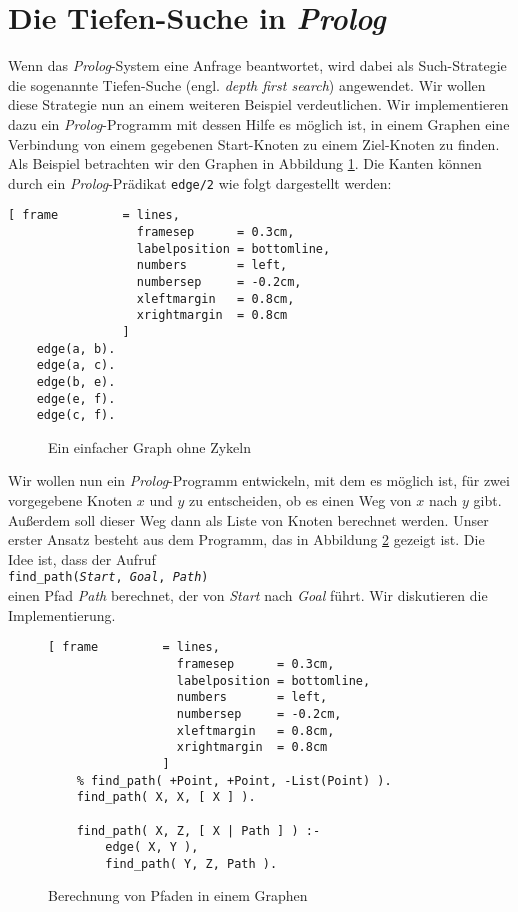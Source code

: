 \section{Die Tiefen-Suche in \textsl{Prolog}}
Wenn das \textsl{Prolog}-System eine Anfrage beantwortet, wird dabei als Such-Strategie
die sogenannte Tiefen-Suche (engl. \emph{depth first search}) angewendet.  Wir wollen
diese Strategie nun an einem weiteren Beispiel verdeutlichen.  Wir implementieren dazu ein
\textsl{Prolog}-Programm  
mit dessen Hilfe es möglich ist, in einem Graphen eine Verbindung von einem gegebenen
Start-Knoten zu einem Ziel-Knoten zu finden.  Als Beispiel betrachten wir den Graphen in
Abbildung \ref{fig:graph}.  Die Kanten können durch ein \textsl{Prolog}-Prädikat \texttt{edge/2}
wie folgt dargestellt werden:

\begin{Verbatim}[ frame         = lines, 
                  framesep      = 0.3cm, 
                  labelposition = bottomline,
                  numbers       = left,
                  numbersep     = -0.2cm,
                  xleftmargin   = 0.8cm,
                  xrightmargin  = 0.8cm
                ]
    edge(a, b).
    edge(a, c).
    edge(b, e).
    edge(e, f).
    edge(c, f).
\end{Verbatim}

\begin{figure}[!h]
  \centering
  \caption{Ein einfacher Graph ohne Zykeln}
  \label{fig:graph}
\end{figure}

Wir wollen nun ein \textsl{Prolog}-Programm entwickeln, mit dem es möglich ist, für zwei
vorgegebene Knoten $x$ und $y$ zu entscheiden, ob es einen Weg von $x$ nach $y$ gibt.
Außerdem soll dieser Weg dann als Liste von Knoten berechnet werden.
Unser erster Ansatz besteht aus dem Programm, das in Abbildung \ref{fig:connect} gezeigt
ist.  Die Idee ist, dass der Aufruf \\[0.1cm]
\hspace*{1.3cm} \texttt{find\_path(\textsl{Start}, \textsl{Goal}, \textsl{Path})} \\[0.1cm]
einen Pfad \textsl{Path} berechnet, der von \textsl{Start} nach \textsl{Goal} führt.  Wir diskutieren
die Implementierung.

\begin{figure}[!h]
  \centering
\begin{Verbatim}[ frame         = lines, 
                  framesep      = 0.3cm, 
                  labelposition = bottomline,
                  numbers       = left,
                  numbersep     = -0.2cm,
                  xleftmargin   = 0.8cm,
                  xrightmargin  = 0.8cm
                ]
    % find_path( +Point, +Point, -List(Point) ).
    find_path( X, X, [ X ] ).
    
    find_path( X, Z, [ X | Path ] ) :-
        edge( X, Y ),
        find_path( Y, Z, Path ).
\end{Verbatim}
\vspace*{-0.3cm}
  \caption{Berechnung von Pfaden in einem Graphen}
  \label{fig:connect}
\end{figure}

